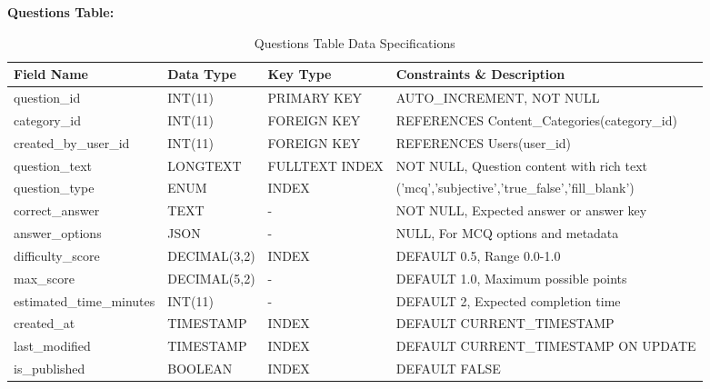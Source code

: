 \documentclass[12pt,a4paper,oneside]{book}
\begin{document}
\textbf{Questions Table:}
\begin{table}[H]
\centering
\caption{Questions Table Data Specifications}
\footnotesize
\begin{tabular}{|L{3cm}|L{2.5cm}|L{1.5cm}|L{5cm}|}
\hline
\textbf{Field Name} & \textbf{Data Type} & \textbf{Key Type} & \textbf{Constraints \& Description} \\
\hline
question\_id & INT(11) & PRIMARY KEY & AUTO\_INCREMENT, NOT NULL \\
\hline
category\_id & INT(11) & FOREIGN KEY & REFERENCES Content\_Categories(category\_id) \\
\hline
created\_by\_user\_id & INT(11) & FOREIGN KEY & REFERENCES Users(user\_id) \\
\hline
question\_text & LONGTEXT & FULLTEXT INDEX & NOT NULL, Question content with rich text \\
\hline
question\_type & ENUM & INDEX & ('mcq','subjective','true\_false','fill\_blank') \\
\hline
correct\_answer & TEXT & - & NOT NULL, Expected answer or answer key \\
\hline
answer\_options & JSON & - & NULL, For MCQ options and metadata \\
\hline
difficulty\_score & DECIMAL(3,2) & INDEX & DEFAULT 0.5, Range 0.0-1.0 \\
\hline
max\_score & DECIMAL(5,2) & - & DEFAULT 1.0, Maximum possible points \\
\hline
estimated\_time\_minutes & INT(11) & - & DEFAULT 2, Expected completion time \\
\hline
created\_at & TIMESTAMP & INDEX & DEFAULT CURRENT\_TIMESTAMP \\
\hline
last\_modified & TIMESTAMP & INDEX & DEFAULT CURRENT\_TIMESTAMP ON UPDATE \\
\hline
is\_published & BOOLEAN & INDEX & DEFAULT FALSE \\
\hline
\end{tabular}
\end{table}
\end{document}
